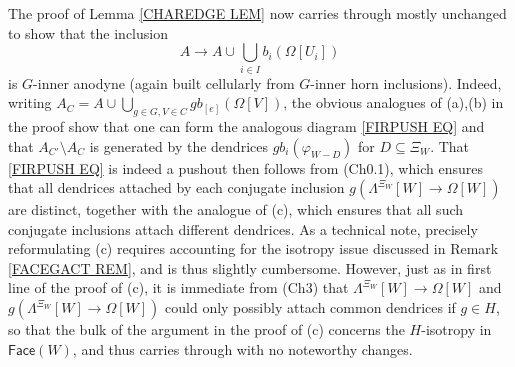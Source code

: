 \documentclass[a4paper,10pt
 ,draft
]{article}%
\begin{document}
\begin{remark}
The proof of Lemma \ref{CHAREDGE LEM} now carries through mostly unchanged to show that the inclusion
\begin{equation}
	A \to A \cup \bigcup_{i \in I} b_i(\Omega[U_i])
\end{equation}
is $G$-inner anodyne (again built cellularly from $G$-inner horn inclusions).
Indeed, writing 
$A_C = 
A \cup \bigcup_{g\in G,V \in C} g b_{[e]}(\Omega[V])$,
the obvious analogues of (a),(b) in the proof
show that one can form the analogous diagram \eqref{FIRPUSH EQ} and that
$A_{C'} \setminus A_{C}$ is generated by the dendrices
$g b_i(\varphi_{W-D})$ for $D \subseteq \Xi_W$. 
That \eqref{FIRPUSH EQ} is indeed a pushout then follows from (Ch0.1), which ensures that all dendrices attached by each conjugate inclusion
$g\left(\Lambda^{\Xi_W}[W] \to \Omega[W]\right)$
are distinct, together with the analogue of (c), 
which ensures that all such conjugate inclusions
attach different dendrices.
As a technical note, precisely reformulating (c) requires accounting for the isotropy issue discussed in Remark \ref{FACEGACT REM}, and is thus slightly cumbersome. However, just as in first line of the proof of (c), it is immediate from (Ch3) that
$\Lambda^{\Xi_W}[W] \to \Omega[W]$
and $g\left(\Lambda^{\Xi_W}[W] \to \Omega[W]\right)$
could only possibly attach common dendrices if $g\in H$, so that the bulk of the argument in the proof of (c) concerns the $H$-isotropy in $\mathsf{Face}(W)$, 
and thus carries through with no noteworthy changes.
\end{remark}
\end{document}
